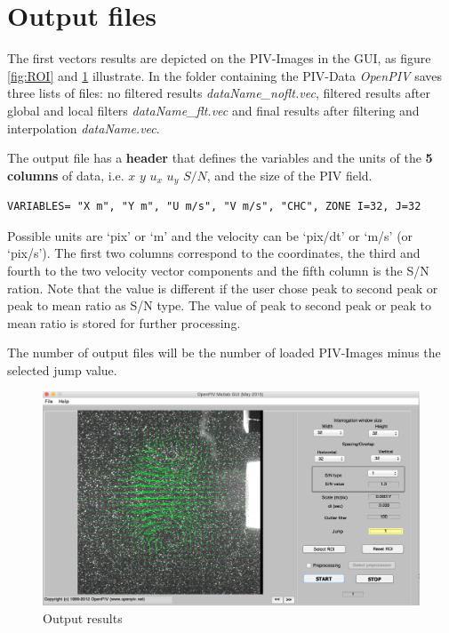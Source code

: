 \section{Output files}\label{Output files}

The first vectors results are depicted on the PIV-Images in the GUI, as figure \ref{fig:ROI} and 
\ref{fig:Out} illustrate. In the folder containing the PIV-Data \emph{OpenPIV} saves three lists 
of files: no filtered results \emph{dataName\_noflt.vec}, filtered results after global and local 
filters \emph{dataName\_flt.vec} and final results after filtering and interpolation 
\emph{dataName.vec}. 

The output file has a \textbf{header} that defines the variables and the units of the \textbf{5 columns} of data, i.e. $x$ $y$ $u_{x}$ $u_{y}$ $S/N$, and the size of the PIV field. 



 \begin{lstlisting}
VARIABLES= "X m", "Y m", "U m/s", "V m/s", "CHC", ZONE I=32, J=32
 \end{lstlisting}
  
  
 Possible units are `pix' or `m' and the velocity can be `pix/dt' or `m/s' (or `pix/s'). The first two columns  correspond to the coordinates, the third and fourth to the two velocity vector components  and the fifth column is the S/N ration. Note that the value is different if the user chose peak  to second peak or peak to mean ratio as S/N type. The value of peak to second peak or peak  to mean ratio is stored for further processing.



The number of output files will be the number of loaded PIV-Images minus the selected jump value.
\begin{figure}[H]
	\centering
	\includegraphics[width=\textwidth]{Images/output.png}
	\caption{Output results}
	\label{fig:Out}
\end{figure}


